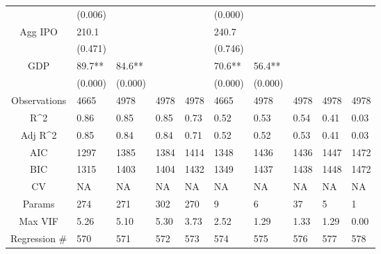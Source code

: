 \documentclass{article}
\begin{document}
\begin{table}[H]
\begin{tabular}{|clllllllll|}
   & (0.006) &  &  &  & (0.000) &  &  &  &  \\ 
  Agg IPO & 210.1 &  &  &  & 240.7 &  &  &  &  \\ 
   & (0.471) &  &  &  & (0.746) &  &  &  &  \\ 
  GDP & 89.7** & 84.6** &  &  & 70.6** & 56.4** &  &  &  \\ 
   & (0.000) & (0.000) &  &  & (0.000) & (0.000) &  &  &  \\ 
  \hline 
 Observations & 4665 & 4978 & 4978 & 4978 & 4665 & 4978 & 4978 & 4978 & 4978 \\ 
  R^2 & 0.86 & 0.85 & 0.85 & 0.73 & 0.52 & 0.53 & 0.54 & 0.41 & 0.03 \\ 
  Adj R^2 & 0.85 & 0.84 & 0.84 & 0.71 & 0.52 & 0.52 & 0.53 & 0.41 & 0.03 \\ 
  AIC & 1297 & 1385 & 1384 & 1414 & 1348 & 1436 & 1436 & 1447 & 1472 \\ 
  BIC & 1315 & 1403 & 1404 & 1432 & 1349 & 1437 & 1438 & 1448 & 1472 \\ 
  CV & NA & NA & NA & NA & NA & NA & NA & NA & NA \\ 
  Params & 274 & 271 & 302 & 270 & 9 & 6 & 37 & 5 & 1 \\ 
  Max VIF & 5.26 & 5.10 & 5.30 & 3.73 & 2.52 & 1.29 & 1.33 & 1.29 & 0.00 \\ 
  Regression \# & 570 & 571 & 572 & 573 & 574 & 575 & 576 & 577 & 578 \\ 
   \hline
\end{tabular}
 
\end{table}
\end{document}
